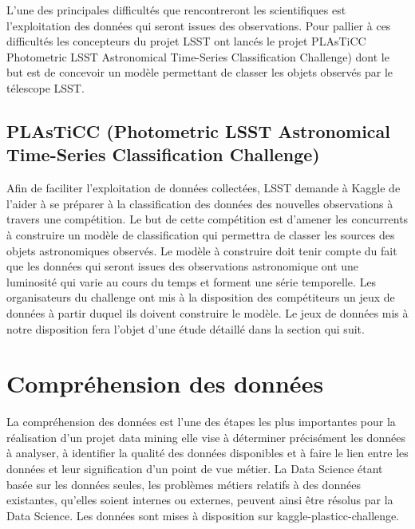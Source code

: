 L’une des principales difficultés que rencontreront les scientifiques est l’exploitation des données qui seront issues des observations.
Pour pallier à ces difficultés les concepteurs du projet LSST ont lancés le projet PLAsTiCC  Photometric LSST Astronomical Time-Series Classification Challenge) dont le but est de concevoir un modèle permettant de classer les objets observés par le télescope LSST.

\subsection{PLAsTiCC  (Photometric LSST Astronomical Time-Series Classification Challenge)}
Afin de faciliter l’exploitation de données collectées, LSST demande à Kaggle de l’aider à se préparer à la classification des données des nouvelles observations à travers une compétition. 
Le but de cette compétition est d’amener les concurrents  à construire un modèle de  classification qui permettra de classer  les sources  des objets astronomiques observés. 
Le modèle à construire doit tenir compte du fait que les données qui seront issues des observations astronomique ont une luminosité qui varie au cours du temps et forment une série temporelle.
Les organisateurs du challenge ont mis à la disposition des compétiteurs un jeux de données à partir duquel ils doivent construire le modèle.
Le jeux de données mis à notre disposition fera l’objet d’une étude détaillé dans la section qui suit.



\section{Compréhension des données}
La compréhension des données est l’une des étapes les plus importantes pour la réalisation d’un projet data mining elle vise à déterminer précisément les données à analyser, à identifier la qualité des données disponibles et à faire le lien entre les données
et leur signification d’un point de vue métier. La Data Science étant basée sur les données seules, les problèmes métiers relatifs à des données existantes, qu’elles soient internes ou externes, peuvent ainsi être résolus par la Data Science. Les données sont mises à
disposition sur kaggle-plasticc-challenge.

